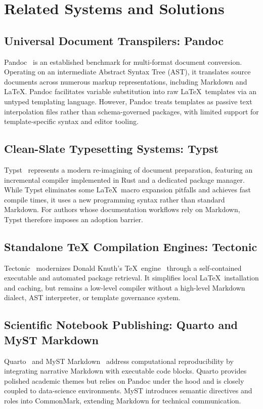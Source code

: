 \section{Related Systems and Solutions}
\subsection{Universal Document Transpilers: Pandoc}
Pandoc~\cite{ref3} is an established benchmark for multi-format document conversion. Operating on an intermediate Abstract Syntax Tree (AST), it translates source documents across numerous markup representations, including Markdown and \LaTeX. Pandoc facilitates variable substitution into raw \LaTeX\ templates via an untyped templating language. However, Pandoc treats templates as passive text interpolation files rather than schema-governed packages, with limited support for template-specific syntax and editor tooling.

\subsection{Clean-Slate Typesetting Systems: Typst}
Typst~\cite{ref5} represents a modern re-imagining of document preparation, featuring an incremental compiler implemented in Rust and a dedicated package manager. While Typst eliminates some \LaTeX\ macro expansion pitfalls and achieves fast compile times, it uses a new programming syntax rather than standard Markdown. For authors whose documentation workflows rely on Markdown, Typst therefore imposes an adoption barrier.

\subsection{Standalone TeX Compilation Engines: Tectonic}
Tectonic~\cite{ref6} modernizes Donald Knuth's \TeX\ engine~\cite{knuth1984texbook} through a self-contained executable and automated package retrieval. It simplifies local \LaTeX\ installation and caching, but remains a low-level compiler without a high-level Markdown dialect, AST interpreter, or template governance system.

\subsection{Scientific Notebook Publishing: Quarto and MyST Markdown}
Quarto~\cite{ref4} and MyST Markdown~\cite{myst2024,brown2021executable} address computational reproducibility by integrating narrative Markdown with executable code blocks. Quarto provides polished academic themes but relies on Pandoc under the hood and is closely coupled to data-science environments. MyST introduces semantic directives and roles into CommonMark, extending Markdown for technical communication.

